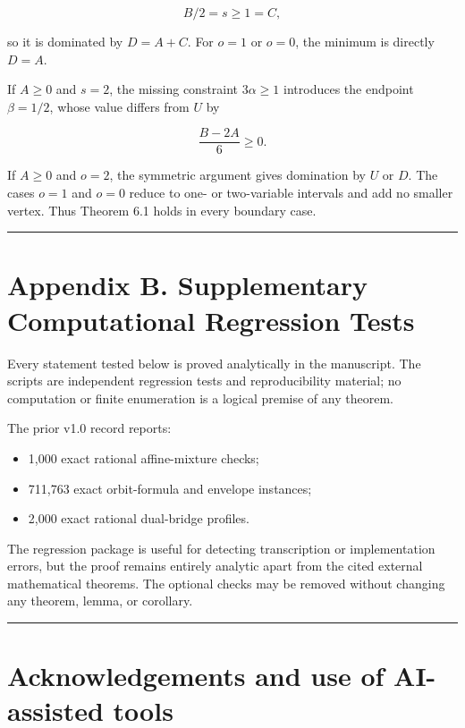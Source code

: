 \documentclass[11pt,a4paper]{article}
\providecommand{\tightlist}{\setlength{\itemsep}{0pt}\setlength{\parskip}{0pt}}
\begin{document}
\[
B/2=s\ge1=C,
\]

so it is dominated by \(D=A+C\). For \(o=1\) or \(o=0\), the minimum is directly \(D=A\).

If \(A\ge0\) and \(s=2\), the missing constraint \(3\alpha\ge1\) introduces the endpoint \(\beta=1/2\), whose value differs from \(U\) by

\[
\frac{B-2A}{6}\ge0.
\]

If \(A\ge0\) and \(o=2\), the symmetric argument gives domination by \(U\) or \(D\). The cases \(o=1\) and \(o=0\) reduce to one- or two-variable intervals and add no smaller vertex. Thus Theorem 6.1 holds in every boundary case.

\begin{center}\rule{0.5\linewidth}{0.5pt}\end{center}

\section{Appendix B. Supplementary Computational Regression Tests}\label{appendix-b.-supplementary-computational-regression-tests}

Every statement tested below is proved analytically in the manuscript. The scripts are independent regression tests and reproducibility material; no computation or finite enumeration is a logical premise of any theorem.

The prior v1.0 record reports:

\begin{itemize}
\tightlist
\item
  1,000 exact rational affine-mixture checks;
\item
  711,763 exact orbit-formula and envelope instances;
\item
  2,000 exact rational dual-bridge profiles.
\end{itemize}

The regression package is useful for detecting transcription or implementation errors, but the proof remains entirely analytic apart from the cited external mathematical theorems. The optional checks may be removed without changing any theorem, lemma, or corollary.

\begin{center}\rule{0.5\linewidth}{0.5pt}\end{center}

\section{Acknowledgements and use of AI-assisted tools}\label{acknowledgements-and-use-of-ai-assisted-tools}
\end{document}
